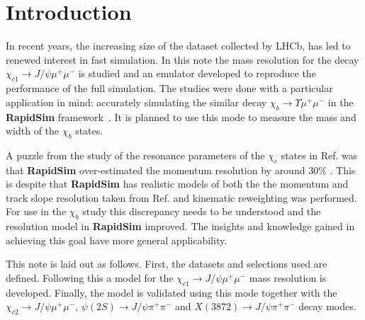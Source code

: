 \section{Introduction}
\label{sec:Introduction}
%
In recent years, the increasing size of the dataset collected
by LHCb, has led to renewed interest in fast simulation. In this note the
mass resolution for the decay $\chi_{c1} \rightarrow J/\psi \mu^+ \mu^-$ is studied and
an emulator developed to reproduce the performance of the full
simulation. The studies were done with a
particular application in mind: accurately simulating the similar
decay  $\chi_{b} \rightarrow \Upsilon \mu^+ \mu^-$ in the \textbf{RapidSim}
framework~\cite{Cowan:2016tnm}. It is planned to use this mode to
measure the mass and width of the $\chi_b$
states. 

A puzzle from the study of the resonance parameters of the $\chi_c$ states in
Ref. \cite{Anderlini:2270922} was that \textbf{RapidSim} over-estimated the momentum
resolution by around $30 \%$ \cite{LHCb-PAPER-2017-036}. This is
despite that \textbf{RapidSim} has realistic models of both the
the momentum and track slope resolution taken from Ref. \cite{Needham:1080556} and
kinematic reweighting was performed. For use in the $\chi_{b}$
study this discrepancy needs to be understood and the resolution model
in \textbf{RapidSim} improved. The insights and knowledge gained in
achieving this goal have more general
applicability. 

This note is laid out as follows. First, the datasets and selections
used are defined. Following this a model for the  $\chi_{c1} \rightarrow J/\psi \mu^+ \mu^-$ mass resolution is
developed. Finally, the model is validated using this mode together
with the $\chi_{c2} \rightarrow J/\psi \mu^+ \mu^-$, 
$\psi(2S) \rightarrow J/\psi \pi^+ \pi^-$ and $X(3872) \rightarrow
J/\psi \pi^+ \pi^-$ decay modes. 
